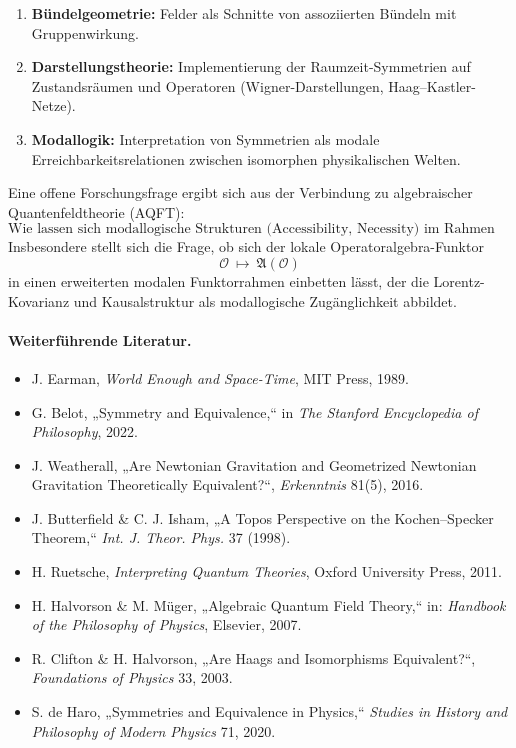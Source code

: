 \documentclass[10pt, letterpaper]{article}
\begin{document}
\begin{enumerate}
\item \textbf{Bündelgeometrie:} Felder als Schnitte von assoziierten Bündeln mit Gruppenwirkung.
\item \textbf{Darstellungstheorie:} Implementierung der Raumzeit-Symmetrien auf Zustandsräumen und Operatoren (Wigner-Darstellungen, Haag–Kastler-Netze).
\item \textbf{Modallogik:} Interpretation von Symmetrien als modale Erreichbarkeitsrelationen zwischen isomorphen physikalischen Welten.
\end{enumerate}

Eine offene Forschungsfrage ergibt sich aus der Verbindung zu algebraischer Quantenfeldtheorie (AQFT):
\[
\text{Wie lassen sich modallogische Strukturen
(Accessibility, Necessity)
im Rahmen der AQFT rekonstruieren?}
\]
Insbesondere stellt sich die Frage, ob sich der lokale Operatoralgebra-Funktor
\[
\mathcal{O}\ \longmapsto\ \mathfrak{A}(\mathcal{O})
\]
in einen erweiterten modalen Funktorrahmen einbetten lässt,
der die Lorentz-Kovarianz und Kausalstruktur als
modallogische Zugänglichkeit abbildet.

\bigskip

\paragraph{Weiterführende Literatur.}
\begin{itemize}
\item J. Earman, \emph{World Enough and Space-Time}, MIT Press, 1989.
\item G. Belot, „Symmetry and Equivalence,“ in \emph{The Stanford Encyclopedia of Philosophy}, 2022.
\item J. Weatherall, „Are Newtonian Gravitation and Geometrized Newtonian Gravitation Theoretically Equivalent?“, \emph{Erkenntnis} 81(5), 2016.
\item J. Butterfield \& C. J. Isham, „A Topos Perspective on the Kochen–Specker Theorem,“ \emph{Int. J. Theor. Phys.} 37 (1998).
\item H. Ruetsche, \emph{Interpreting Quantum Theories}, Oxford University Press, 2011.
\item H. Halvorson \& M. Müger, „Algebraic Quantum Field Theory,“ in: \emph{Handbook of the Philosophy of Physics}, Elsevier, 2007.
\item R. Clifton \& H. Halvorson, „Are Haags and Isomorphisms Equivalent?“, \emph{Foundations of Physics} 33, 2003.
\item S. de Haro, „Symmetries and Equivalence in Physics,“ \emph{Studies in History and Philosophy of Modern Physics} 71, 2020.
\end{itemize}
\end{document}
